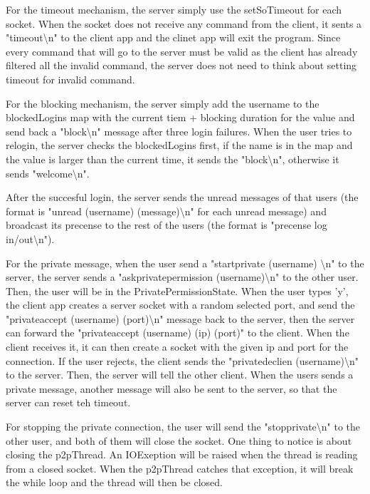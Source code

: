 \documentclass[10pt]{article}
\begin{document}
For the timeout mechanism, the server simply use the setSoTimeout for each socket. When the socket does not receive any command from the client, it sents a "timeout\textbackslash n" to the client app and the clinet app will exit the program. Since every command that will go to the server must be valid as the client has already filtered all the invalid command, the server does not need to think about setting timeout for invalid command.

For the blocking mechanism, the server simply add the username to the blockedLogins map with the current tiem + blocking duration for the value and send back a "block\textbackslash n" message after three login failures. When the user tries to relogin, the server checks the blockedLogins first, if the name is in the map and the value is larger than the current time, it sends the "block\textbackslash n", otherwise it sends "welcome\textbackslash n".

After the succesful login, the server sends the unread messages of that users (the format is "unread (username) (message)\textbackslash n" for each unread message) and broadcast its precense to the rest of the users (the format is "precense log in/out\textbackslash n").

For the private message, when the user send a "startprivate (username) \textbackslash n" to the server, the server sends a "askprivatepermission (username)\textbackslash n" to the other user. Then, the user will be in the PrivatePermissionState. When the user types 'y', the client app creates a server  socket with a random selected port, and send the "privateaccept (username) (port)\textbackslash n" message back to the server, then the server can forward the "privateaccept (username) (ip) (port)" to the client. When the client receives it, it can then create a socket with the given ip and port for the connection. If the user rejects, the client sends the "privatedeclien (username)\textbackslash n" to the server. Then, the server will tell the other client. When the users sends a private message, another message will also be sent to the server, so that the server can reset teh timeout.

For stopping the private connection, the user will send the "stopprivate\textbackslash n" to the other user, and both of them will close the socket. One thing to notice is about closing the p2pThread. An IOExeption will be raised when the thread is reading from a closed socket. When the p2pThread catches that exception, it will break the while loop and the thread will then be closed.
\end{document}
